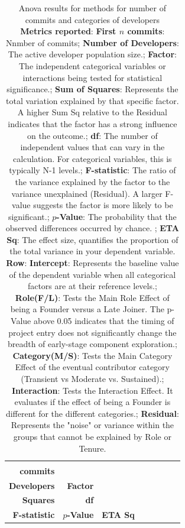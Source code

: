 \begin{table}[H]
\centering
\setlength{\tabcolsep}{2pt}
\caption[Standard Anova Results for methods]{Anova results for methods for number of commits and categories of developers\\ \textbf{Metrics reported}:   \textbf{First $n$ commits}: Nnmber of commits;  \textbf{Number of Developers}: The active developer population size.;  \textbf{Factor}: The independent categorical variables or interactions being tested for statistical significance.;  \textbf{Sum of Squares}: Represents the total variation explained by that specific factor. A higher Sum Sq relative to the Residual indicates that the factor has a strong influence on the outcome.;  \textbf{df}: The number of independent values that can vary in the calculation. For categorical variables, this is typically N-1 levels.;  \textbf{F-statistic}: The ratio of the variance explained by the factor to the variance unexplained (Residual). A larger F-value suggests the factor is more likely to be significant.;  \textbf{$p$-Value}: The probability that the observed differences occurred by chance. ;  \textbf{ETA Sq}: The effect size, quantifies the proportion of the total variance in your dependent variable.
\\ \textbf{Row}:   \textbf{Intercept}: Represents the baseline value of the dependent variable when all categorical factors are at their reference levels.;  \textbf{Role(F/L)}: Tests the Main Role Effect of being a Founder versus a Late Joiner. The p-Value above 0.05 indicates that the timing of project entry does not significantly change the breadth of early-stage component exploration.;  \textbf{Category(M/S)}: Tests the Main Category Effect of the eventual contributor category (Transient vs Moderate vs. Sustained).;  \textbf{Interaction}: Tests the Interaction Effect. It evaluates if the effect of being a Founder is different for the different categories.;  \textbf{Residual}: Represents the "noise" or variance within the groups that cannot be explained by Role or Tenure.
}
\begin{tabular}{r r l r r r r r}
\toprule
\makecell[t]{\textbf{First $n$}\\\textbf{commits}} & \makecell[t]{\textbf{Number of}\\\textbf{Developers}} & \textbf{Factor} & \makecell[t]{\textbf{Sum of}\\\textbf{Squares}} & \textbf{df} & \makecell[t]{\textbf{}\\\textbf{F-statistic}} & \textbf{$p$-Value} & \textbf{ETA Sq} \\ 

\end{tabular}
\end{table}
